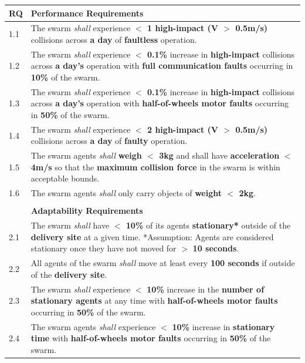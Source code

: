 \documentclass[runningheads]{llncs}
\begin{document}
\begin{table}[!b]
	\centering
	\begin{tabular}{p{5mm} p{116mm} }
		RQ & \textbf{Performance Requirements}\\
		\hline
		1.1 & The swarm \emph{shall} experience \textbf{$<$ 1 high-impact (V $>$ 0.5m/s)} collisions across \textbf{a day} of \textbf{faultless} operation. \\ 
		\hline
		1.2 & The swarm \emph{shall} experience \textbf{$<$ 0.1\%} increase in \textbf{high-impact} collisions across \textbf{a day's} operation with \textbf{full communication faults} occurring in \textbf{10\%} of the swarm.\\ 
		\hline
		1.3 & The swarm \emph{shall} experience \textbf{$<$ 0.1\%} increase in \textbf{high-impact} collisions across \textbf{a day's} operation with \textbf{half-of-wheels motor faults} occurring in \textbf{50\%} of the swarm.	\\	
		\hline
		1.4 & The swarm \emph{shall} experience \textbf{$<$ 2 high-impact (V $>$ 0.5m/s)} collisions across \textbf{a day} of \textbf{faulty} operation.  \\		 		
		\hline
        1.5 & The swarm agents \emph{shall} \textbf{weigh $<$ 3kg} and shall have \textbf{acceleration} \textbf{$<$ 4m/s} so that the \textbf{maximum collision force} in the swarm is within acceptable bounds. \\
        \hline
        1.6 & The swarm agents \emph{shall} only carry objects of \textbf{weight $<$ 2kg}. \\ 
        \hline \\[-1.25\medskipamount]
		& \textbf{Adaptability Requirements}\\
		\hline
		2.1 & The swarm \emph{shall} have \textbf{$<$ 10\%} of its agents \textbf{stationary*} outside of the \textbf{delivery site} at a given time.
		*Assumption: Agents are considered stationary once they have not moved for $>$ \textbf{10 seconds}.
		\\ 
		\hline
		2.2 & All agents of the swarm \emph{shall} move at least every \textbf{100 seconds} if outside of the \textbf{delivery site}.\\ 
		\hline
		2.3 & The swarm \emph{shall} experience $<$ \textbf{10\%} increase in the \textbf{number of stationary agents} at any time with \textbf{half-of-wheels motor faults} occurring in \textbf{50\%} of the swarm. \\
		\hline
		2.4 & The swarm agents \emph{shall} experience $<$ \textbf{10\%} increase in \textbf{stationary time} with \textbf{half-of-wheels motor faults} occurring in \textbf{50\%} of  the swarm.\\ 

\end{tabular}
\end{table}
\end{document}
